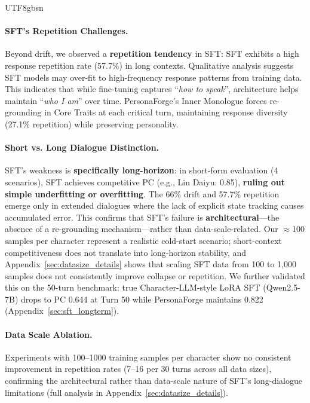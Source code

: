 \documentclass[11pt]{article}
\begin{document}
\begin{CJK*}{UTF8}{gbsn}
\paragraph{SFT's Repetition Challenges.} Beyond drift, we observed a \textbf{repetition tendency} in SFT: SFT exhibits a high response repetition rate (57.7\%) in long contexts. Qualitative analysis suggests SFT models may over-fit to high-frequency response patterns from training data. This indicates that while fine-tuning captures ``\textit{how to speak}'', architecture helps maintain ``\textit{who I am}'' over time. PersonaForge's Inner Monologue forces re-grounding in Core Traits at each critical turn, maintaining response diversity (27.1\% repetition) while preserving personality.

\paragraph{Short vs. Long Dialogue Distinction.} SFT's weakness is \textbf{specifically long-horizon}: in short-form evaluation (4 scenarios), SFT achieves competitive PC (e.g., Lin Daiyu: 0.85), \textbf{ruling out simple underfitting or overfitting}. The 66\% drift and 57.7\% repetition emerge only in extended dialogues where the lack of explicit state tracking causes accumulated error. This confirms that SFT's failure is \textbf{architectural}---the absence of a re-grounding mechanism---rather than data-scale-related. Our $\approx$100 samples per character represent a realistic cold-start scenario; short-context competitiveness does not translate into long-horizon stability, and Appendix~\ref{sec:datasize_details} shows that scaling SFT data from 100 to 1,000 samples does not consistently improve collapse or repetition. We further validated this on the 50-turn benchmark: true Character-LLM-style LoRA SFT (Qwen2.5-7B) drops to PC 0.644 at Turn 50 while PersonaForge maintains 0.822 (Appendix~\ref{sec:sft_longterm}).



\paragraph{Data Scale Ablation.} Experiments with 100--1000 training samples per character show no consistent improvement in repetition rates (7--16 per 30 turns across all data sizes), confirming the architectural rather than data-scale nature of SFT's long-dialogue limitations (full analysis in Appendix~\ref{sec:datasize_details}).



\end{CJK*}
\end{document}
